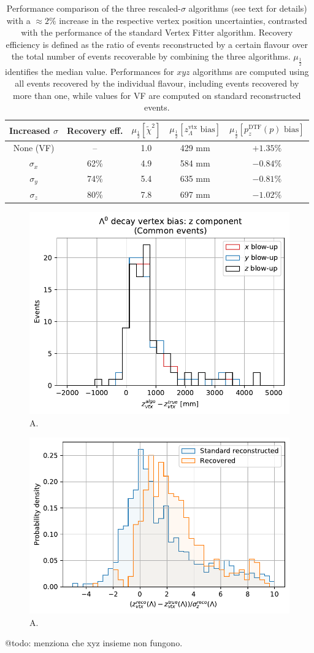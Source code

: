 \begin{table}[t]
	\begin{center}
	\begin{tabular}{|c||c|c|c|c|}
		\hline
		Increased $\sigma$ & Recovery eff. & $\mu_\frac{1}{2}\left[\tilde{\chi}^2\right]$ & $\mu_\frac{1}{2}\left[z_\Lambda^\text{vtx} \text{ bias}\right]$ & $\mu_\frac{1}{2}\left[p_z^\text{DTF} (p) \text{ bias}\right]$ \\
		\hline
		\hline
		None (VF)  & -- & 1.0 & 429 mm & $+1.35\%$ \\
		\hline
		$\sigma_x$ & 62\% & 4.9 & 584 mm & $-0.84\%$ \\
		$\sigma_y$ & 74\% & 5.4 & 635 mm & $-0.81\%$ \\
		$\sigma_z$ & 80\% & 7.8 & 697 mm & $-1.02\%$ \\
		\hline
	\end{tabular}
	\end{center}
	\caption{Performance comparison of the three rescaled-$\sigma$ algorithms (see text for details) with a $\approx 2\%$ increase in the respective vertex position uncertainties, contrasted with the performance of the standard Vertex Fitter algorithm. Recovery efficiency is defined as the ratio of events reconstructed by a certain flavour over the total number of events recoverable by combining the three algorithms. $\mu_\frac{1}{2}$ identifies the median value. Performances for $xyz$ algorithms are computed using all events recovered by the individual flavour, including events recovered by more than one, while values for VF are computed on standard reconstructed events.}
\end{table}


\begin{figure}[t]
	\centering
	\includegraphics[width=.6\textwidth]{graphics/03-vertex_reconstruction/Lambda_endvertex_z_bias_xyz_common.pdf}
	\caption{A.}
\end{figure}

\begin{figure}
	\centering
	\includegraphics[width=.6\textwidth]{graphics/03-vertex_reconstruction/xyz_L_ENDVERTEX_residual_2Dv3D_z_rel.pdf}
	\caption{A.}
\end{figure}

@todo: menziona che xyz insieme non fungono.